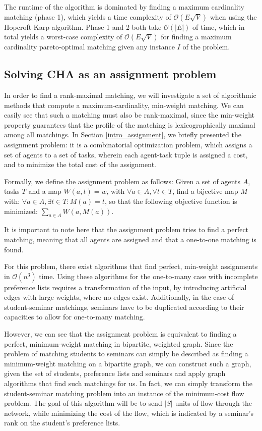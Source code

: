 The runtime of the algorithm is dominated by finding a maximum cardinality matching (phase 1), which yields a time complexity of $\mathcal{O}(E\sqrt{V})$\cite{Abraham:Pacha} when using the Hopcroft-Karp algorithm. Phase 1 and 2 both take $\mathcal{O}(|E|)$ of time\cite{SngThesis}, which in total yields a worst-case complexity of $\mathcal{O}(E\sqrt{V})$ for finding a maximum cardinality pareto-optimal matching given any instance $I$ of the problem.

\subsection{Solving CHA as an assignment problem}\label{algo:assignment}
In order to find a rank-maximal matching, we will investigate a set of algorithmic methods that compute a maximum-cardinality, min-weight matching. We can easily see that such a matching must also be rank-maximal, since the min-weight property guarantees that the profile of the matching is lexicographically maximal among all matchings.
In Section \ref{intro_assignment}, we briefly presented the assignment problem: it is a combinatorial optimization problem, which assigns a set of agents to a set of tasks, wherein each agent-task tuple is assigned a cost, and to minimize the total cost of the assignment. 


Formally, we define the assignment problem as follows: Given a set of agents $A$, tasks $T$ and a map $W(a, t) = w$, with $\forall a \in A, \forall t \in T$, find a bijective map $M$ with: $\forall a \in A, \exists t \in T: M(a) = t$, so that the following objective function is minimized: $\sum_{a \in A} W(a, M(a))$. 

It is important to note here that the assignment problem tries to find a perfect matching, meaning that all agents are assigned and that a one-to-one matching is found.

For this problem, there exist algorithms \cite{Munkres, Jonker1987} that find perfect, min-weight assignments in $\mathcal{O}(n^3)$ time. Using these algorithms for the one-to-many case with incomplete preference lists requires a transformation of the input, by introducing artificial edges with large weights, where no edges exist. Additionally, in the case of student-seminar matchings, seminars have to be duplicated according to their capacities to allow for one-to-many matching.
  
However, we can see that the assignment problem is equivalent to finding a perfect, minimum-weight matching in bipartite, weighted graph. Since the problem of matching students to seminars can simply be described as finding a minimum-weight matching on a bipartite graph, we can construct such a graph, given the set of students, preference lists and seminars and apply graph algorithms that find such matchings for us. In fact, we can simply transform the student-seminar matching problem into an instance of the minimum-cost flow problem. The goal of this algorithm will be to send $|S|$ units of flow through the network, while minimizing the cost of the flow, which is indicated by a seminar's rank on the student's preference lists.

